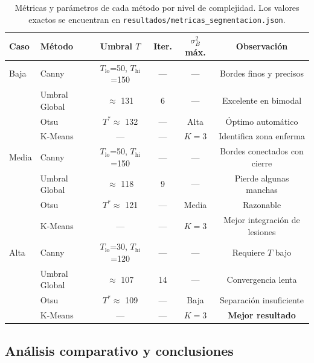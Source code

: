 \documentclass[11pt,a4paper]{article}
\begin{document}
\begin{table}[H]
    \centering
    \renewcommand{\arraystretch}{1.4}
    \begin{tabular}{@{} l l c c c c @{}}
        \toprule
        \textbf{Caso} & \textbf{Método} & \textbf{Umbral $T$} &
        \textbf{Iter.} & \textbf{$\sigma_B^2$ máx.} & \textbf{Observación} \\
        \midrule
        Baja
            & Canny        & $T_{\text{lo}}$=50, $T_{\text{hi}}$=150 & — & — & Bordes finos y precisos \\
            & Umbral Global & $\approx$ 131 & 6 & — & Excelente en bimodal \\
            & Otsu         & $T^*\approx$ 132 & — & Alta & Óptimo automático \\
            & K-Means      & — & — & $K=3$ & Identifica zona enferma \\
        \midrule
        Media
            & Canny        & $T_{\text{lo}}$=50, $T_{\text{hi}}$=150 & — & — & Bordes conectados con cierre \\
            & Umbral Global & $\approx$ 118 & 9 & — & Pierde algunas manchas \\
            & Otsu         & $T^*\approx$ 121 & — & Media & Razonable \\
            & K-Means      & — & — & $K=3$ & Mejor integración de lesiones \\
        \midrule
        Alta
            & Canny        & $T_{\text{lo}}$=30, $T_{\text{hi}}$=120 & — & — & Requiere $T$ bajo \\
            & Umbral Global & $\approx$ 107 & 14 & — & Convergencia lenta \\
            & Otsu         & $T^*\approx$ 109 & — & Baja & Separación insuficiente \\
            & K-Means      & — & — & $K=3$ & \textbf{Mejor resultado} \\
        \bottomrule
    \end{tabular}
    \caption{Métricas y parámetros de cada método por nivel de complejidad.
    Los valores exactos se encuentran en \texttt{resultados/metricas\_segmentacion.json}.}
    \label{tab:metricas}
\end{table}

\subsection{Análisis comparativo y conclusiones}
\end{document}
